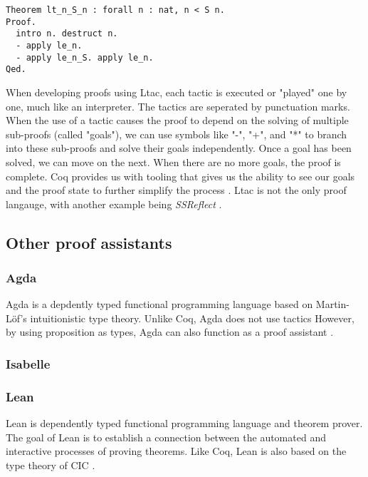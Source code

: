 \begin{minipage}{\linewidth}
\begin{lstlisting}[language=Coq, label={lst:ltac_ex}, caption={Example of Ltac syntax}]
Theorem lt_n_S_n : forall n : nat, n < S n.
Proof.
  intro n. destruct n.
  - apply le_n.
  - apply le_n_S. apply le_n.
Qed.
\end{lstlisting}
\end{minipage}

When developing proofs using Ltac, each tactic is executed or "played" one by one,
much like an interpreter. The tactics are seperated by punctuation marks.
When the use of a tactic causes the proof to depend on the solving of multiple sub-proofs (called "goals"),
we can use symbols like "-", "+", and "*" to branch into these sub-proofs and solve their goals independently.
Once a goal has been solved, we can move on the next. When there are no more goals, the proof is complete.
Coq provides us with tooling that gives us the ability to see our goals and the proof state
to further simplify the process \cite{cide}.
Ltac is not the only proof langauge, with another example being \emph{SSReflect} \cite{cssr}.

\subsection{Other proof assistants}
\label{ssec:other_proof_assistants}

\subsubsection{Agda}
\label{sssec:agda}

Agda is a depdently typed functional programming language based on Martin-Löf's
intuitionistic type theory. Unlike Coq, Agda does not use tactics
However, by using proposition as types, Agda can also function as a proof assistant
\cite{agdatut}.

\subsubsection{Isabelle}
\label{sssec:isabelle}

\subsubsection{Lean}
\label{sssec:lean}

Lean is dependently typed functional programming language and theorem prover.
The goal of Lean is to establish a connection between the automated and interactive processes of proving theorems.
Like Coq, Lean is also based on the type theory of CIC
\cite{lean}.


